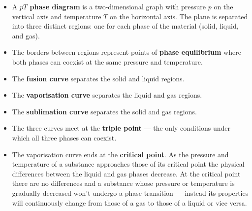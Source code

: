 \documentclass{article}
\begin{document}
\begin{itemize}
  \item A \textbf{$p T$ phase diagram} is a two-dimensional graph with pressure $p$ on the vertical axis and temperature $T$ on the horizontal axis. The plane is separated into three distinct regions: one for each phase of the material (solid, liquid, and gas).

  \item The borders between regions represent points of \textbf{phase equilibrium} where both phases can coexist at the same pressure and temperature.

  \item The \textbf{fusion curve} separates the solid and liquid regions.

  \item The \textbf{vaporisation curve} separates the liquid and gas regions.

  \item The \textbf{sublimation curve} separates the solid and gas regions.

  \item The three curves meet at the \textbf{triple point} — the only conditions under which all three phases can coexist.

  \item The vaporisation curve ends at the \textbf{critical point}. As the pressure and temperature of a substance approaches those of its critical point the physical differences between the liquid and gas phases decrease. At the critical point there are no differences and a substance whose pressure or temperature is gradually decreased won't undergo a phase transition — instead its properties will continuously change from those of a gas to those of a liquid or vice versa.
\end{itemize}
\end{document}
